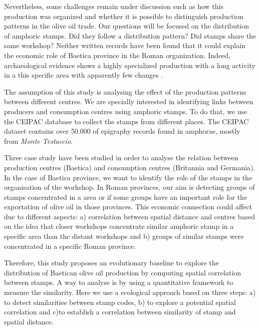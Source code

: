 \documentclass[review]{elsarticle}
\begin{document}
Nevertheless, some challenges remain under discussion such as how this production was organized and whether it is possible to distinguish production patterns in the olive oil trade. Our questions will be focused on the distribution of amphoric stamps. Did they follow a distribution pattern? Did stamps share the same workshop? Neither written records have been found that it could explain the economic role of Baetica province in the Roman organization. Indeed, archaeological evidence shows a highly specialized production with a long activity in a this specific area with apparently few changes \citep{remesal_anforas_2004}. 


The assumption of this study is analysing the effect of the production patterns between different centres. We are specially interested in identifying links between producers and consumption centres using amphoric stamps. To do that, we use the CEIPAC database to collect the stamps from different places. The CEIPAC dataset contains over 50.000 of epigraphy records found in amphorae, mostly from \textit{Monte Testaccio}.

Three case study have been studied in order to analyse the relation between production centres (Baetica) and consumption centres (Britannia and Germania). In the case of Baetica province, we want to identify the role of the stamps in the organisation of the workshop. In Roman provinces, our aim is detecting groups of stamps concentrated in a area or if some groups have an important role for the exportation of olive oil in those provinces. This economic connection could affect due to different aspects: a) correlation between spatial distance and centres based on the idea that closer workshops concentrate similar amphoric stamp in a specific area than the distant workshops and b) groups of similar stamps were concentrated in a specific Roman province. 

Therefore, this study proposes an evolutionary baseline to explore the distribution of Baetican olive oil production by computing spatial correlation between stamps. A way to analyse is by using a quantitative framework to measure the similarity. Here we use a ecological approach based on three steps: a) to detect similarities between stamp codes, b) to explore a potential spatial correlation and c)to establish a correlation between similarity of stamp and spatial distance. 
\end{document}

